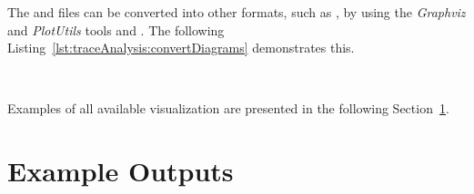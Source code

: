 \begin{figure}[H]
\begin{graybox}
\end{graybox}
\end{figure}

\noindent The  and  files can be converted into other formats, %
such as , by using the \textit{Graphviz} and \textit{PlotUtils} tools %
 and . %
The following Listing~\ref{lst:traceAnalysis:convertDiagrams} demonstrates this. %




% 


\

Examples of all available visualization are presented in the following %
Section~\ref{sec:traceAnalysisExamples}.

\pagebreak

\section{Example \KiekerTraceAnalysis{} Outputs}\label{sec:traceAnalysisExamples}
